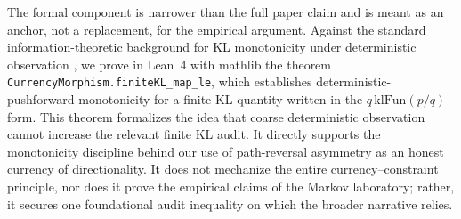The formal component is narrower than the full paper claim and is meant as an anchor, not a replacement, for the empirical argument. Against the standard information-theoretic background for KL monotonicity under deterministic observation \cite{coverthomas2006}, we prove in Lean~4 with mathlib \cite{demoura2015lean,mathlib2020} the theorem \texttt{CurrencyMorphism.finiteKL\_map\_le}, which establishes deterministic-pushforward monotonicity for a finite KL quantity written in the \(q\,\mathrm{klFun}(p/q)\) form. This theorem formalizes the idea that coarse deterministic observation cannot increase the relevant finite KL audit. It directly supports the monotonicity discipline behind our use of path-reversal asymmetry as an honest currency of directionality. It does not mechanize the entire currency--constraint principle, nor does it prove the empirical claims of the Markov laboratory; rather, it secures one foundational audit inequality on which the broader narrative relies.
